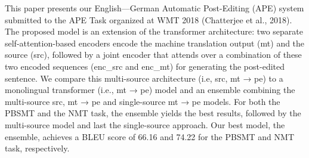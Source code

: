 This paper presents our English---German Automatic Post-Editing (APE) system submitted to the APE Task organized at WMT 2018 (Chatterjee et al., 2018). The proposed model is an extension of the transformer architecture: two separate self-attention-based encoders encode the machine translation output (mt) and the source (src), followed by a joint encoder that attends over a combination of these two encoded sequences (enc\_{src} and enc\_{mt}) for generating the post-edited sentence. We compare this multi-source architecture (i.e, {src, mt} → pe) to a monolingual transformer (i.e., mt → pe) model and an ensemble combining the multi-source {src, mt} → pe and single-source mt → pe models. For both the PBSMT and the NMT task, the ensemble yields the best results, followed by the multi-source model and last the single-source approach. Our best model, the ensemble, achieves a BLEU score of 66.16 and 74.22 for the PBSMT and NMT task, respectively.
